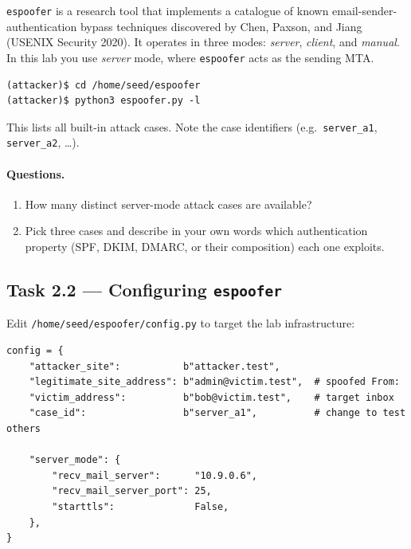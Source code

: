 \documentclass[11pt]{article}
\begin{document}
\texttt{espoofer} is a research tool that implements a catalogue of
known email-sender-authentication bypass techniques discovered by Chen,
Paxson, and Jiang (USENIX Security 2020).
It operates in three modes: \emph{server}, \emph{client}, and
\emph{manual}.
In this lab you use \emph{server} mode, where \texttt{espoofer} acts as
the sending MTA.

\begin{listing}[H]
\begin{verbatim}
(attacker)$ cd /home/seed/espoofer
(attacker)$ python3 espoofer.py -l
\end{verbatim}
\end{listing}

This lists all built-in attack cases.
Note the case identifiers (e.g.\ \texttt{server\_a1},
\texttt{server\_a2}, \ldots).

\paragraph{Questions.}
\begin{enumerate}[noitemsep]
  \item How many distinct server-mode attack cases are available?
  \item Pick three cases and describe in your own words which
        authentication property (SPF, DKIM, DMARC, or their composition)
        each one exploits.
\end{enumerate}

\subsection{Task 2.2 --- Configuring \texttt{espoofer}}

Edit \texttt{/home/seed/espoofer/config.py} to target the lab
infrastructure:

\begin{listing}[H]
\begin{verbatim}
config = {
    "attacker_site":           b"attacker.test",
    "legitimate_site_address": b"admin@victim.test",  # spoofed From:
    "victim_address":          b"bob@victim.test",    # target inbox
    "case_id":                 b"server_a1",          # change to test others

    "server_mode": {
        "recv_mail_server":      "10.9.0.6",
        "recv_mail_server_port": 25,
        "starttls":              False,
    },
}
\end{verbatim}
\end{listing}
\end{document}

